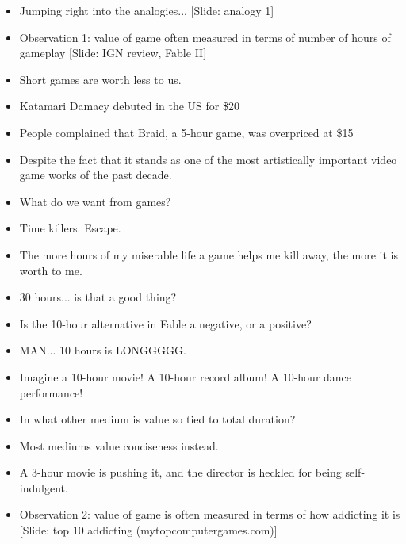 \documentclass[12pt]{article}
\begin{document}
{\begin{itemize}
\item Jumping right into the analogies...  [Slide:  analogy 1]



\item Observation 1:  value of game often measured in terms of number of hours of gameplay [Slide:  IGN review, Fable II]

\item Short games are worth less to us.  

\item Katamari Damacy debuted in the US for \$20

\item People complained that Braid, a 5-hour game, was overpriced at \$15

\item Despite the fact that it stands as one of the most artistically important video game works of the past decade.

\item What do we want from games?

\item Time killers.  Escape.

\item The more hours of my miserable life a game helps me kill away, the more it is worth to me.

\item 30 hours... is that a good thing?

\item Is the 10-hour alternative in Fable a negative, or a positive?

\item MAN... 10 hours is LONGGGGG.

\item Imagine a 10-hour movie!  A 10-hour record album!  A 10-hour dance performance!

\item In what other medium is value so tied to total duration?

\item Most mediums value conciseness instead.  

\item A 3-hour movie is pushing it, and the director is heckled for being self-indulgent.

\item Observation 2: value of game is often measured in terms of how addicting it is [Slide:  top 10 addicting (mytopcomputergames.com)]


\end{itemize}}
\end{document}
